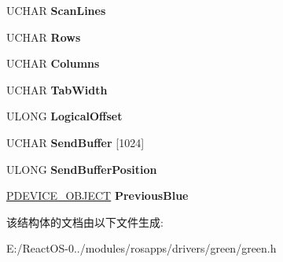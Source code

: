 \begin{DoxyCompactItemize}
U\+C\+H\+AR {\bfseries Scan\+Lines}
\item 
\mbox{\label{struct___s_c_r_e_e_n___d_e_v_i_c_e___e_x_t_e_n_s_i_o_n_a4602158a5f687bba719008acb49032d1}} 
U\+C\+H\+AR {\bfseries Rows}
\item 
\mbox{\label{struct___s_c_r_e_e_n___d_e_v_i_c_e___e_x_t_e_n_s_i_o_n_a4b154a8b6a825e24f91b85b8758c278a}} 
U\+C\+H\+AR {\bfseries Columns}
\item 
\mbox{\label{struct___s_c_r_e_e_n___d_e_v_i_c_e___e_x_t_e_n_s_i_o_n_ac85abc3e961986d1011d72af04e9f4ec}} 
U\+C\+H\+AR {\bfseries Tab\+Width}
\item 
\mbox{\label{struct___s_c_r_e_e_n___d_e_v_i_c_e___e_x_t_e_n_s_i_o_n_a3c41e641a7d67be8c90c2b116e9ed462}} 
U\+L\+O\+NG {\bfseries Logical\+Offset}
\item 
\mbox{\label{struct___s_c_r_e_e_n___d_e_v_i_c_e___e_x_t_e_n_s_i_o_n_ade1dc900f267733e3efcdf00b7ba2e02}} 
U\+C\+H\+AR {\bfseries Send\+Buffer} \mbox{[}1024\mbox{]}
\item 
\mbox{\label{struct___s_c_r_e_e_n___d_e_v_i_c_e___e_x_t_e_n_s_i_o_n_a6b056e1080eeefc763a83880780438e3}} 
U\+L\+O\+NG {\bfseries Send\+Buffer\+Position}
\item 
\mbox{\label{struct___s_c_r_e_e_n___d_e_v_i_c_e___e_x_t_e_n_s_i_o_n_ad6fa1326c8ec965196bd566eba3aa7dd}} 
\hyperlink{struct___d_e_v_i_c_e___o_b_j_e_c_t}{P\+D\+E\+V\+I\+C\+E\+\_\+\+O\+B\+J\+E\+CT} {\bfseries Previous\+Blue}
\end{DoxyCompactItemize}


该结构体的文档由以下文件生成\+:\begin{DoxyCompactItemize}
\item 
E\+:/\+React\+O\+S-\/0../modules/rosapps/drivers/green/green.\+h\end{DoxyCompactItemize}
